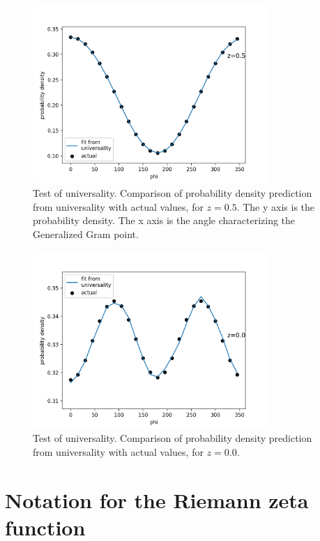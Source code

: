 \documentclass[twoside]{article}
\begin{document}
\begin{figure}
\centering
\includegraphics[width=0.8\textwidth]{z05.png}
\caption[]{ 
 Test of universality. Comparison of probability density prediction from
 universality with actual values, for $z=0.5$. The y axis is the probability density.
 The x axis is the angle characterizing the Generalized Gram point.
  }
\vspace{1mm}
\label{z05}
\end{figure}

\begin{figure}
\centering
\includegraphics[width=0.8\textwidth]{z00.png}
\caption[]{ 
 Test of universality. Comparison of probability density prediction from
 universality with actual values, for $z=0.0$. 
  }
\vspace{1mm}
\label{z00}
\end{figure}

\section{\label{sec2}Notation for the Riemann zeta function}
\end{document}
